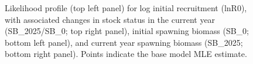 \documentclass[
]{scrartcl}
\begin{document}
\begin{figure}


\caption{\label{fig-rzero-parm}Likelihood profile (top left panel) for
log initial recruitment (lnR0), with associated changes in stock status
in the current year (SB\_2025/SB\_0; top right panel), initial spawning
biomass (SB\_0; bottom left panel), and current year spawning biomass
(SB\_2025; bottom right panel). Points indicate the base model MLE
estimate.}

\end{figure}%

\pagebreak
\end{document}
